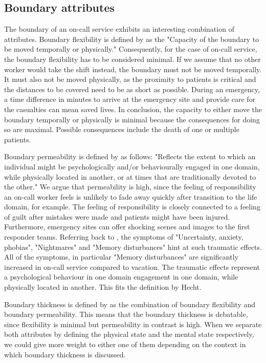 \documentclass{CML_Seminar_Template}
\begin{document}
\subsection{Boundary attributes}
The boundary of an on-call service exhibits an interesting combination of attributes. Boundary flexibility is defined by \cite[]{Piszczek2014} as the "Capacity of the boundary to be moved temporally or physically." Consequently, for the case of on-call service, the boundary flexibility has to be considered minimal. If we assume that no other worker would take the shift instead, the boundary must not be moved temporally. It must also not be moved physically, as the proximity to patients is critical and the distances to be covered need to be as short as possible. During an emergency, a time difference in minutes to arrive at the emergency site and provide care for the casualties can mean saved lives. In conclusion, the capacity to either move the boundary temporally or physically is minimal because the consequences for doing so are maximal. Possible consequences include the death of one or multiple patients.
\par
Boundary permeability is defined by \cite[]{Hecht2009} as follows: "Reflects the extent to which an individual might be psychologically and/or behaviourally engaged in one domain, while physically located in another, or at times that are traditionally devoted to the other." We argue that permeability is high, since the feeling of responsibility an on-call worker feels is unlikely to fade away quickly after transition to the life domain, for example. The feeling of responsibility is closely connected to a feeling of guilt after mistakes were made and patients might have been injured. Furthermore, emergency sites can offer shocking scenes and images to the first responder teams. Referring back to \cite[]{Lindfors2006}, the symptoms of "Uncertainty, anxiety, phobias", "Nightmares" and "Memory disturbances" hint at such traumatic effects. All of the symptoms, in particular "Memory disturbances" are significantly increased in on-call service compared to vacation. The traumatic effects represent a psychological behaviour in one domain engagement in one domain, while physically located in another. This fits the definition by Hecht.
\par
Boundary thickness is defined by \cite[]{Ashforth2000} as the combination of boundary flexibility and boundary permeability. This means that the boundary thickness is debatable, since flexibility is minimal but permeability in contrast is high. When we separate both attributes by defining the physical state and the mental state respectively, we could give more weight to either one of them depending on the context in which boundary thickness is discussed. 
\end{document}
